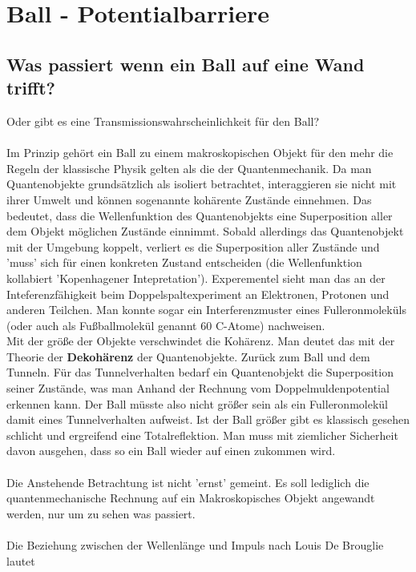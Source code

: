 



\section*{Ball - Potentialbarriere}

\subsection*{Was passiert wenn ein Ball auf eine Wand trifft?}

Oder gibt es eine Transmissionswahrscheinlichkeit für den Ball?\\
\\
Im Prinzip gehört ein Ball zu einem makroskopischen Objekt für den mehr die Regeln der klassische Physik gelten als die der Quantenmechanik. Da man Quantenobjekte grundsätzlich als isoliert betrachtet, interaggieren sie nicht mit ihrer Umwelt und können sogenannte kohärente Zustände einnehmen. Das bedeutet, dass die Wellenfunktion des Quantenobjekts eine Superposition aller dem Objekt möglichen Zustände einnimmt. Sobald allerdings das Quantenobjekt mit der Umgebung koppelt, verliert es die Superposition aller Zustände und 'muss' sich für einen konkreten Zustand entscheiden (die Wellenfunktion kollabiert 'Kopenhagener Intepretation'). Experementel sieht man das an der Inteferenzfähigkeit beim Doppelspaltexperiment an Elektronen, Protonen und anderen Teilchen. Man konnte sogar ein Interferenzmuster eines Fulleronmoleküls (oder auch als Fußballmolekül genannt 60 C-Atome) nachweisen.\\

Mit der größe der Objekte verschwindet die Kohärenz. Man deutet das mit der Theorie der \textbf{Dekohärenz} der Quantenobjekte. Zurück zum Ball und dem Tunneln. Für das Tunnelverhalten bedarf ein Quantenobjekt die Superposition seiner Zustände, was man Anhand der Rechnung vom Doppelmuldenpotential erkennen kann. Der Ball müsste also nicht größer sein als ein Fulleronmolekül damit eines Tunnelverhalten aufweist. Ist der Ball größer gibt es klassisch gesehen schlicht und ergreifend eine Totalreflektion. Man muss mit ziemlicher Sicherheit davon ausgehen, dass so ein Ball wieder auf einen zukommen wird.\\
\\
Die Anstehende Betrachtung ist nicht 'ernst' gemeint. Es soll lediglich die quantenmechanische Rechnung auf ein Makroskopisches Objekt angewandt werden, nur um zu sehen was passiert.\\
\\
Die Beziehung zwischen der Wellenlänge und Impuls nach Louis De Brouglie lautet

